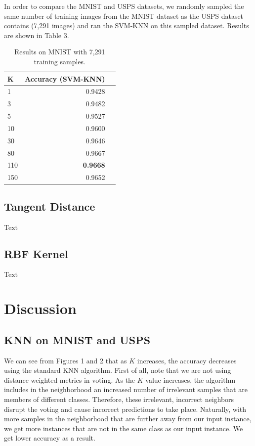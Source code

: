 \documentclass[11pt,letterpaper]{article}
\begin{document}
In order to compare the MNIST and USPS datasets, we randomly sampled the same number of training images from the MNIST dataset as the USPS dataset contains (7,291 images) and ran the SVM-KNN on this sampled dataset. Results are shown in Table 3.

\begin{table}
\begin{center}
\begin{tabular}{|l|r|r|}
\hline \bf K & \bf Accuracy (SVM-KNN) \\ \hline
1 & 0.9428 \\
3 & 0.9482 \\
5 & 0.9527 \\
10 & 0.9600 \\
30 & 0.9646 \\
80 & 0.9667 \\
110 & \textbf{0.9668} \\
150 & 0.9652 \\
\hline
\end{tabular}
\end{center}
\caption{\label{knn-mnist} Results on MNIST with 7,291 training samples. }
\end{table}

\subsection{Tangent Distance}

Text

\subsection{RBF Kernel}

Text

\section{Discussion}

\subsection{KNN on MNIST and USPS}

We can see from Figures 1 and 2 that as $K$ increases, the accuracy decreases using the standard KNN algorithm. First of all, note that we are not using distance weighted metrics in voting. As the $K$ value increases, the algorithm includes in the neighborhood an increased number of irrelevant samples that are members of different classes. Therefore, these irrelevant, incorrect neighbors disrupt the voting and cause incorrect predictions to take place. Naturally, with more samples in the neighborhood that are further away from our input instance, we get more instances that are not in the same class as our input instance. We get lower accuracy as a result.
\end{document}
